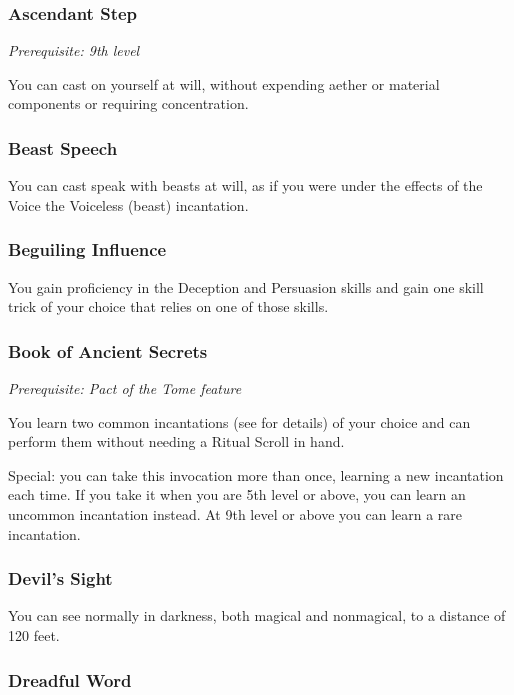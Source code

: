 \subsubsection{Ascendant Step}

\textit{Prerequisite: 9th level}

You can cast  on yourself at will, without expending aether or material components or requiring concentration.

\subsubsection{Beast Speech}

You can cast speak with beasts at will, as if you were under the effects of the Voice the Voiceless (beast) incantation.

\subsubsection{Beguiling Influence}

You gain proficiency in the Deception and Persuasion skills and gain one skill trick of your choice that relies on one of those skills.

\subsubsection{Book of Ancient Secrets}

\textit{Prerequisite: Pact of the Tome feature}

You learn two common incantations (see  for details) of your choice and can perform them without needing a Ritual Scroll in hand.

Special: you can take this invocation more than once, learning a new incantation each time. If you take it when you are 5th level or above, you can learn an uncommon incantation instead. At 9th level or above you can learn a rare incantation.

\subsubsection{Devil's Sight}

You can see normally in darkness, both magical and nonmagical, to a distance of 120 feet.

\subsubsection{Dreadful Word}

